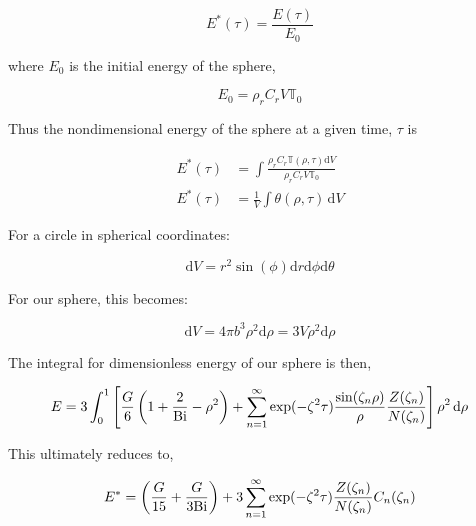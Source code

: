 \begin{equation}
    E^*(\tau)=\frac{E(\tau)}{E_0}
\end{equation}

where $E_0$ is the initial energy of the sphere,

\begin{equation}
    E_0=\rho_rC_rV\mathbb{T}_0
\end{equation}

Thus the nondimensional energy of the sphere at a given time, $\tau$ is

\begin{align}
    E^*(\tau) &=\int\frac{\rho_rC_r\mathbb{T}(\rho,\tau)\mathrm{d}V}{\rho_rC_rV\mathbb{T}_0} \nonumber\\
    E^*(\tau) &=\frac{1}{V}\int \theta(\rho,\tau) \,\mathrm{d}V
\end{align}


For a circle in spherical coordinates:

\begin{equation}
    \mathrm{d}V=r^2\sin(\phi)\mathrm{d}r\mathrm{d}\phi \mathrm{d}\theta
\end{equation}

For our sphere, this becomes:

\begin{equation}
    \mathrm{d}V=4\pi b^3 \rho^{2}\mathrm{d}\rho = 3V \rho^{2}\mathrm{d}\rho
\end{equation}

The integral for dimensionless energy of our sphere is then,

\begin{equation}
    E=3\int_0^1  \left[ \frac{G}{6}\left(1 + \frac{2}{\mathrm{Bi}}-\rho^2\right)  +   \sum_{n=1}^\infty \exp(-\zeta^2 \tau) \frac{\sin(\zeta_n \rho)}{\rho} \frac{Z(\zeta_n)}{N(\zeta_n)}  \right] \rho^{2}\,\mathrm{d}\rho
\end{equation}

This ultimately reduces to,



\begin{equation}
\label{eq:energy-exact}
    E^*=\left(\frac{G}{15}+\frac{G}{3\mathrm{Bi}}\right)+3\sum_{n=1}^\infty \exp(-\zeta^2 \tau) \frac{Z(\zeta_n)}{N(\zeta_n)} C_n(\zeta_n)
\end{equation}


